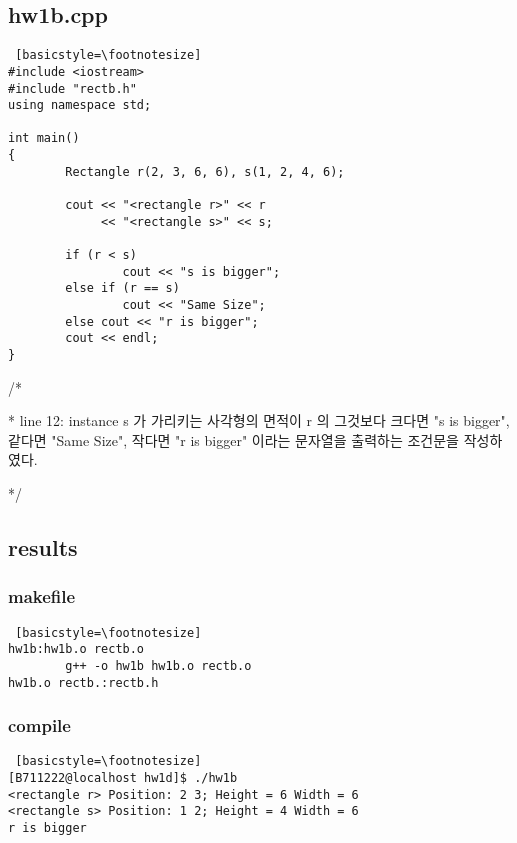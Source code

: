 \documentclass[twoside,twocolumn]{article}
\newenvironment{itemizeReduced}{
\begin{list}{\labelitemi}{\leftmargin=1em}
\setlength{\itemsep}{1pt}
\setlength{\parskip}{0pt}
\setlength{\parsep}{0pt}}{\end{list}
}
\begin{document}
\subsection{hw1b.cpp}
\begin{lstlisting} [basicstyle=\footnotesize]
#include <iostream>
#include "rectb.h"
using namespace std;

int main()
{
        Rectangle r(2, 3, 6, 6), s(1, 2, 4, 6);

        cout << "<rectangle r>" << r
             << "<rectangle s>" << s;

        if (r < s)
                cout << "s is bigger";
        else if (r == s)
                cout << "Same Size";
        else cout << "r is bigger";
        cout << endl;
}
\end{lstlisting}
\begin{itemizeReduced}
    \item[/*] 
    \item[*] line 12: instance s 가 가리키는 사각형의 면적이 r 의 그것보다 크다면 "s is bigger", 같다면 "Same Size", 작다면 "r is bigger" 이라는 문자열을 출력하는 조건문을 작성하였다.
\end{itemizeReduced}
*/

\subsection{results}
\subsubsection{makefile}
\begin{lstlisting} [basicstyle=\footnotesize]
hw1b:hw1b.o rectb.o
        g++ -o hw1b hw1b.o rectb.o
hw1b.o rectb.:rectb.h
\end{lstlisting}

\subsubsection{compile}
\begin{lstlisting} [basicstyle=\footnotesize]
[B711222@localhost hw1d]$ ./hw1b
<rectangle r> Position: 2 3; Height = 6 Width = 6
<rectangle s> Position: 1 2; Height = 4 Width = 6
r is bigger
\end{lstlisting}


\end{document}
